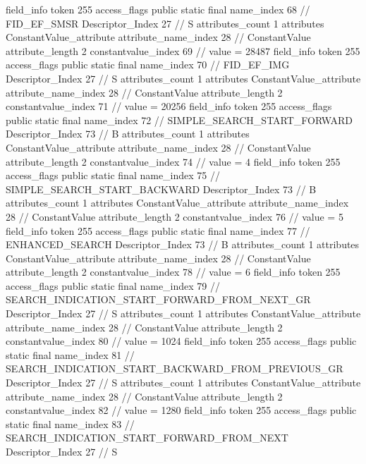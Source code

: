 {{{{{{{				}
				}
			}
			field_info {
				token	255
				access_flags	public static final
				name_index	68		// FID_EF_SMSR
				Descriptor_Index	27		// S
				attributes_count	1
				attributes {
				ConstantValue_attribute {
					attribute_name_index	28		// ConstantValue
					attribute_length	2
					constantvalue_index	69		// value = 28487
				}
				}
			}
			field_info {
				token	255
				access_flags	public static final
				name_index	70		// FID_EF_IMG
				Descriptor_Index	27		// S
				attributes_count	1
				attributes {
				ConstantValue_attribute {
					attribute_name_index	28		// ConstantValue
					attribute_length	2
					constantvalue_index	71		// value = 20256
				}
				}
			}
			field_info {
				token	255
				access_flags	public static final
				name_index	72		// SIMPLE_SEARCH_START_FORWARD
				Descriptor_Index	73		// B
				attributes_count	1
				attributes {
				ConstantValue_attribute {
					attribute_name_index	28		// ConstantValue
					attribute_length	2
					constantvalue_index	74		// value = 4
				}
				}
			}
			field_info {
				token	255
				access_flags	public static final
				name_index	75		// SIMPLE_SEARCH_START_BACKWARD
				Descriptor_Index	73		// B
				attributes_count	1
				attributes {
				ConstantValue_attribute {
					attribute_name_index	28		// ConstantValue
					attribute_length	2
					constantvalue_index	76		// value = 5
				}
				}
			}
			field_info {
				token	255
				access_flags	public static final
				name_index	77		// ENHANCED_SEARCH
				Descriptor_Index	73		// B
				attributes_count	1
				attributes {
				ConstantValue_attribute {
					attribute_name_index	28		// ConstantValue
					attribute_length	2
					constantvalue_index	78		// value = 6
				}
				}
			}
			field_info {
				token	255
				access_flags	public static final
				name_index	79		// SEARCH_INDICATION_START_FORWARD_FROM_NEXT_GR
				Descriptor_Index	27		// S
				attributes_count	1
				attributes {
				ConstantValue_attribute {
					attribute_name_index	28		// ConstantValue
					attribute_length	2
					constantvalue_index	80		// value = 1024
				}
				}
			}
			field_info {
				token	255
				access_flags	public static final
				name_index	81		// SEARCH_INDICATION_START_BACKWARD_FROM_PREVIOUS_GR
				Descriptor_Index	27		// S
				attributes_count	1
				attributes {
				ConstantValue_attribute {
					attribute_name_index	28		// ConstantValue
					attribute_length	2
					constantvalue_index	82		// value = 1280
				}
				}
			}
			field_info {
				token	255
				access_flags	public static final
				name_index	83		// SEARCH_INDICATION_START_FORWARD_FROM_NEXT
				Descriptor_Index	27		// S
}}}}}
